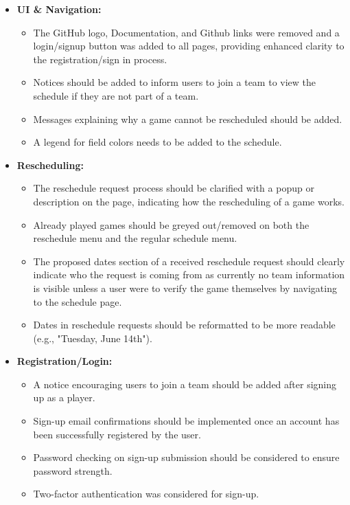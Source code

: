 \documentclass[12pt, titlepage]{article}
\begin{document}
\begin{itemize}
  \item \textbf{UI \& Navigation:}
  \begin{itemize}
    \item The GitHub logo, Documentation, and Github links were removed and a login/signup button was
    added to all pages, providing enhanced clarity to the registration/sign in process.
    \item Notices should be added to inform users to join a team to view the schedule if they are not
    part of a team.
    \item Messages explaining why a game cannot be rescheduled should be added.
    \item A legend for field colors needs to be added to the schedule.
  \end{itemize}
  \item \textbf{Rescheduling:}
  \begin{itemize}
    \item The reschedule request process should be clarified with a popup or description on the page,
    indicating how the rescheduling of a game works.
    \item Already played games should be greyed out/removed on both the reschedule menu and the regular
    schedule menu.
    \item The proposed dates section of a received reschedule request should clearly indicate who the
    request is coming from as currently no team information is visible unless a user were to verify the
    game themselves by navigating to the schedule page.
    \item Dates in reschedule requests should be reformatted to be more readable
    (e.g., "Tuesday, June 14th").
  \end{itemize}
  \item \textbf{Registration/Login:}
  \begin{itemize}
    \item A notice encouraging users to join a team should be added after signing up as a player.
    \item Sign-up email confirmations should be implemented once an account has been successfully
    registered by the user.
    \item Password checking on sign-up submission should be considered to ensure password strength.
    \item Two-factor authentication was considered for sign-up.
  \end{itemize}

\end{itemize}
\end{document}

